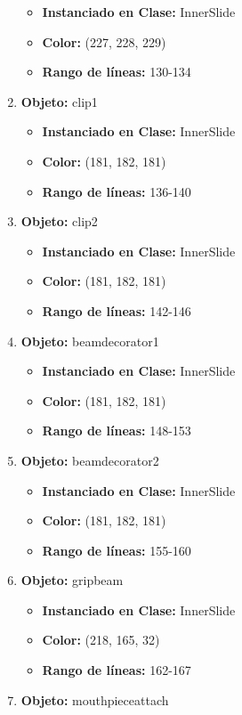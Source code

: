 \documentclass[10pt, a4paper]{article}
\begin{document}
\begin{enumerate}
\begin{itemize}
		\item \textbf{Instanciado en Clase:} InnerSlide
		\item \textbf{Color:} (227, 228, 229)
		\item \textbf{Rango de líneas:} 130-134
	\end{itemize}
	\item \textbf{Objeto:} clip1
	\begin{itemize}
		\item \textbf{Instanciado en Clase:} InnerSlide
		\item \textbf{Color:} (181, 182, 181)
		\item \textbf{Rango de líneas:} 136-140
	\end{itemize}
	\item \textbf{Objeto:} clip2
	\begin{itemize}
		\item \textbf{Instanciado en Clase:} InnerSlide
		\item \textbf{Color:} (181, 182, 181)
		\item \textbf{Rango de líneas:} 142-146
	\end{itemize}
	\item \textbf{Objeto:} beamdecorator1
	\begin{itemize}
		\item \textbf{Instanciado en Clase:} InnerSlide
		\item \textbf{Color:} (181, 182, 181)
		\item \textbf{Rango de líneas:} 148-153
	\end{itemize}
	\item \textbf{Objeto:} beamdecorator2
	\begin{itemize}
		\item \textbf{Instanciado en Clase:} InnerSlide
		\item \textbf{Color:} (181, 182, 181)
		\item \textbf{Rango de líneas:} 155-160
	\end{itemize}
	\item \textbf{Objeto:} gripbeam
	\begin{itemize}
		\item \textbf{Instanciado en Clase:} InnerSlide
		\item \textbf{Color:} (218, 165, 32)
		\item \textbf{Rango de líneas:} 162-167
	\end{itemize}
	\item \textbf{Objeto:} mouthpieceattach
	\begin{itemize}

\end{itemize}
\end{enumerate}
\end{document}
